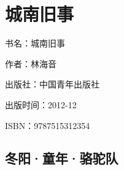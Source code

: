 

\section{城南旧事}


\par 书名：城南旧事
\par 作者：林海音
\par 出版社：中国青年出版社
\par 出版时间：2012-12
\par ISBN：9787515312354








\subsection{冬阳·童年·骆驼队}

